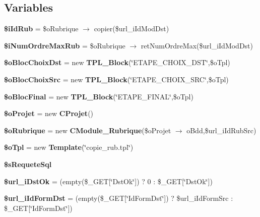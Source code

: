 \subsection*{Variables}
\begin{CompactItemize}
\item 
\textbf{\$iIdRub} = \$oRubrique $\rightarrow$ copier(\$url\_\-iIdModDst)\label{copie__rub_8php_8756afa7ac65ae2afc8d4b37a8b51efb}

\item 
\textbf{\$iNumOrdreMaxRub} = \$oRubrique $\rightarrow$ retNumOrdreMax(\$url\_\-iIdModDst)\label{copie__rub_8php_9526eae6ba9d36782b81efb3d7c34256}

\item 
\textbf{\$oBlocChoixDst} = new {\bf TPL\_\-Block}(\char`\"{}ETAPE\_\-CHOIX\_\-DST\char`\"{},\$oTpl)\label{copie__rub_8php_a0f1cd44252709be7ca4d43a533220de}

\item 
\textbf{\$oBlocChoixSrc} = new {\bf TPL\_\-Block}(\char`\"{}ETAPE\_\-CHOIX\_\-SRC\char`\"{},\$oTpl)\label{copie__rub_8php_4cecff766c78bea7967c9c00a8fde40d}

\item 
\textbf{\$oBlocFinal} = new {\bf TPL\_\-Block}(\char`\"{}ETAPE\_\-FINAL\char`\"{},\$oTpl)\label{copie__rub_8php_0404b3d41507482ec262c7e0605fab5e}

\item 
\textbf{\$oProjet} = new {\bf CProjet}()\label{copie__rub_8php_ec412e7ac901485e72b77d2185159421}

\item 
\textbf{\$oRubrique} = new {\bf CModule\_\-Rubrique}(\$oProjet $\rightarrow$ oBdd,\$url\_\-iIdRubSrc)\label{copie__rub_8php_a16626531b85603a30a4f4d93c5758b1}

\item 
\textbf{\$oTpl} = new {\bf Template}(\char`\"{}copie\_\-rub.tpl\char`\"{})\label{copie__rub_8php_7de57ba665b7c068e98ea46469be2865}

\item 
\textbf{\$sRequeteSql}
\item 
\textbf{\$url\_\-iDstOk} = (empty(\$\_\-GET[\char`\"{}DstOk\char`\"{}]) ? 0 : \$\_\-GET[\char`\"{}DstOk\char`\"{}])\label{copie__rub_8php_42d909467c92be850ded5265fb08476f}

\item 
\textbf{\$url\_\-iIdFormDst} = (empty(\$\_\-GET[\char`\"{}IdFormDst\char`\"{}]) ? \$url\_\-iIdFormSrc : \$\_\-GET[\char`\"{}IdFormDst\char`\"{}])\label{copie__rub_8php_567046dac06231cd778843179645aac5}


\end{CompactItemize}
